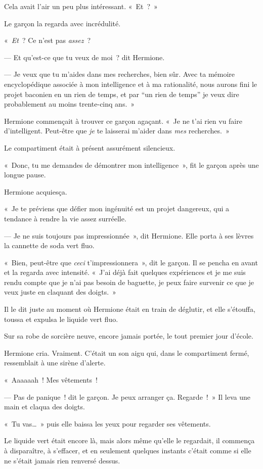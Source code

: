 Cela avait l'air un peu plus intéressant. «~Et~?~»

Le garçon la regarda avec incrédulité.

«~\emph{Et}~? Ce n'est pas \emph{assez}~?

--- Et qu'est-ce que tu veux de moi~? dit Hermione.

--- Je veux que tu m'aides dans mes recherches, bien sûr.
Avec ta mémoire encyclopédique associée à mon intelligence et à ma rationalité, nous aurons fini le projet baconien en un rien de temps, et par “un rien de temps” je veux dire probablement au moins trente-cinq ans.~»

Hermione commençait à trouver ce garçon agaçant.
«~Je ne t'ai rien vu faire d'intelligent.
Peut-être que \emph{je} te laisserai m'aider dans \emph{mes} recherches.~»

Le compartiment était à présent assurément silencieux.

«~Donc, tu me demandes de démontrer mon intelligence~», fit le garçon après une longue pause.

Hermione acquiesça.

«~Je te préviens que défier mon ingénuité est un projet dangereux, qui a tendance à rendre la vie assez surréelle.

--- Je ne suis toujours pas impressionnée~», dit Hermione.  Elle porta à ses lèvres la cannette de soda vert fluo.

«~Bien, peut-être que \emph{ceci} t'impressionnera~», dit le garçon.
Il se pencha en avant et la regarda avec intensité.
«~J'ai déjà fait quelques expériences et je me suis rendu compte que je n'ai pas besoin de baguette, je peux faire survenir ce que je veux juste en claquant des doigts.~»

Il le dit juste au moment où Hermione était en train de déglutir, et elle s'étouffa, toussa et expulsa le liquide vert fluo.

Sur sa robe de sorcière neuve, encore jamais portée, le tout premier jour d'école.

Hermione cria. Vraiment. C'était un son aigu qui, dans le compartiment fermé, ressemblait à une sirène d'alerte.

«~Aaaaaah~! Mes vêtements~!

--- Pas de panique~! dit le garçon. Je peux arranger ça. Regarde~!~»
Il leva une main et claqua des doigts.

«~Tu vas…~» puis elle baissa les yeux pour regarder ses vêtements.

Le liquide vert était encore là, mais alors même qu'elle le regardait, il commença à disparaître, à s'effacer, et en seulement quelques instants c'était comme si elle ne s'était jamais rien renversé dessus.

